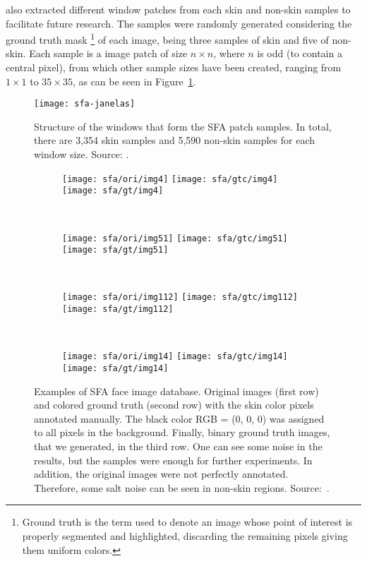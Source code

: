 \citet{sfa-skin-dataset:13} also extracted different window patches from each skin and non-skin samples to facilitate future research. The samples were randomly generated considering the ground truth mask \footnote{Ground truth is the term used to denote an image whose point of interest is properly segmented and highlighted, discarding the remaining pixels giving them uniform colors.} of each image, being three samples of skin and five of non-skin. Each sample is a image patch of size $n \times n$, where $n$ is odd (to contain a central pixel), from which other sample sizes have been created, ranging from $1 \times 1$ to $35 \times 35$, as can be seen in Figure~\ref{fig:sfa_dataset_janelas}.

\begin{figure}[!htb]
  \centering
  \texttt{[image: sfa-janelas]}
  \caption[Structure of the windows that form the SFA patch samples]{Structure of the windows that form the SFA patch samples. In total, there are 3,354 skin samples and 5,590 non-skin samples for each window size. Source: \citet{sfa-skin-dataset:13}.}
  \label{fig:sfa_dataset_janelas}
\end{figure}

\begin{figure}[!htb]
    \centering
    \begin{subfigure}[t]{0.2\textwidth}
        \texttt{[image: sfa/ori/img4]}
        \texttt{[image: sfa/gtc/img4]}
        \texttt{[image: sfa/gt/img4]}
    \end{subfigure}
    ~
    \begin{subfigure}[t]{0.2\textwidth}
        \texttt{[image: sfa/ori/img51]}
        \texttt{[image: sfa/gtc/img51]}
        \texttt{[image: sfa/gt/img51]}
    \end{subfigure}
    ~
    \begin{subfigure}[t]{0.2\textwidth}
        \texttt{[image: sfa/ori/img112]}
        \texttt{[image: sfa/gtc/img112]}
        \texttt{[image: sfa/gt/img112]}
    \end{subfigure}
    ~ %
    \begin{subfigure}[t]{0.2\textwidth}
        \texttt{[image: sfa/ori/img14]}
        \texttt{[image: sfa/gtc/img14]}
        \texttt{[image: sfa/gt/img14]}
    \end{subfigure}
    \caption[Examples of SFA face image database]{Examples of SFA face image database. Original images (first row) and colored ground truth (second row) with the skin color pixels annotated manually. The black color RGB = (0, 0, 0) was assigned to all pixels in the background. Finally, binary ground truth images, that we generated, in the third row. One can see some noise in the results, but the samples were enough for further experiments. In addition, the original images were not perfectly annotated. Therefore, some salt noise can be seen in non-skin regions. Source:~\citet{sfa-skin-dataset:13}.}
    \label{fig:sfa_dataset_exemplo}
\end{figure}


